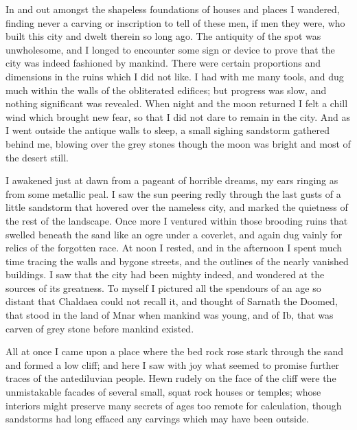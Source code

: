 \documentclass{article}
\begin{document}
In and out amongst the shapeless foundations of houses and places I wandered,
finding never a carving or inscription to tell of these men, if men they were,
who built this city and dwelt therein so long ago. The antiquity of the spot
was unwholesome, and I longed to encounter some sign or device to prove that
the city was indeed fashioned by mankind. There were certain proportions and
dimensions in the ruins which I did not like. I had with me many tools, and dug
much within the walls of the obliterated edifices; but progress was slow, and
nothing significant was revealed. When night and the moon returned I felt a
chill wind which brought new fear, so that I did not dare to remain in the
city. And as I went outside the antique walls to sleep, a small sighing
sandstorm gathered behind me, blowing over the grey stones though the moon was
bright and most of the desert still.

I awakened just at dawn from a pageant of horrible dreams, my ears ringing as
from some metallic peal. I saw the sun peering redly through the last gusts of
a little sandstorm that hovered over the nameless city, and marked the
quietness of the rest of the landscape. Once more I ventured within those
brooding ruins that swelled beneath the sand like an ogre under a coverlet, and
again dug vainly for relics of the forgotten race. At noon I rested, and in the
afternoon I spent much time tracing the walls and bygone streets, and the
outlines of the nearly vanished buildings. I saw that the city had been mighty
indeed, and wondered at the sources of its greatness. To myself I pictured all
the spendours of an age so distant that Chaldaea could not recall it, and
thought of Sarnath the Doomed, that stood in the land of Mnar when mankind was
young, and of Ib, that was carven of grey stone before mankind existed.

All at once I came upon a place where the bed rock rose stark through the sand
and formed a low cliff; and here I saw with joy what seemed to promise further
traces of the antediluvian people. Hewn rudely on the face of the cliff were
the unmistakable facades of several small, squat rock houses or temples; whose
interiors might preserve many secrets of ages too remote for calculation,
though sandstorms had long effaced any carvings which may have been outside.
\end{document}
